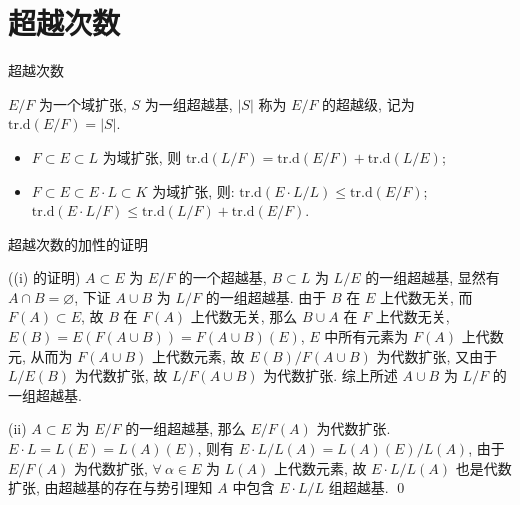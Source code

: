 
\section[超越次数]{超越次数}


\begin{frame}{超越次数}

$E/F$ 为一个域扩张, $S$ 为一组超越基, $|S|$ 称为 $E/F$ 的超越级,
记为 $\mathrm{tr.d}(E/F) = |S|$.

\pause

\begin{lem}[超越次数的加性]
\begin{itemize}
\item[(i)] $F \subset E \subset L$ 为域扩张,
  则 $\mathrm{tr.d}(L/F) = \mathrm{tr.d}(E/F) + \mathrm{tr.d}(L/E)$;
\item[(ii)] $F \subset E \subset E \cdot L \subset K$ 为域扩张, 则:
   $\mathrm{tr.d}(E \cdot L/L) \leq \mathrm{tr.d}(E/F)$;
   $\mathrm{tr.d}(E \cdot L/F) \leq \mathrm{tr.d}(L/F)
  + \mathrm{tr.d}(E/F)$.
\end{itemize}
\end{lem}

\end{frame}


\begin{frame}{超越次数的加性的证明}

\startproof[bg=yellow, fg=red]((i) 的证明)
$A \subset E$ 为 $E/F$ 的一个超越基, $B \subset L$ 为 $L/E$ 的一组超越基,
显然有 $A \cap B = \varnothing$, 下证 $A \cup B$ 为 $L/F$ 的一组超越基.
由于 $B$ 在 $E$ 上代数无关, 而 $F(A) \subset E$,
故 $B$ 在 $F(A)$ 上代数无关, 那么 $B \cup A$ 在 $F$ 上代数无关,
$E(B) = E(F(A \cup B)) = F(A \cup B)(E)$,
$E$ 中所有元素为 $F(A)$ 上代数元, 从而为 $F(A \cup B)$ 上代数元素,
故 $E(B)/F(A \cup B)$ 为代数扩张,
又由于 $L/E(B)$ 为代数扩张, 故 $L/F(A \cup B)$ 为代数扩张.
综上所述 $A \cup B$ 为 $L/F$ 的一组超越基.

\pause

(ii) $A \subset E$ 为 $E/F$ 的一组超越基,
那么 $E/F(A)$ 为代数扩张.
$E \cdot L = L(E) = L(A)(E)$, 则有
$E \cdot L/L(A) = L(A)(E)/L(A)$,
由于 $E/F(A)$ 为代数扩张, $\forall\ \alpha \in E$ 为 $L(A)$ 上代数元素,
故 $E \cdot L/L(A)$ 也是代数扩张, 由超越基的存在与势引理知 $A$ 中包含
$E \cdot L/L$ 组超越基.
\qed

\end{frame}



